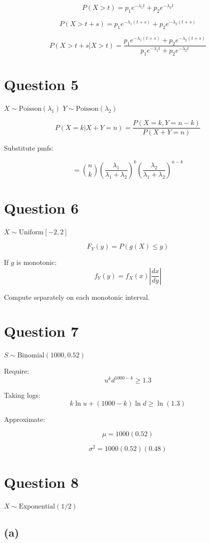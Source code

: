 \documentclass[12pt]{article}
\begin{document}
\[
P(X>t)=p_1 e^{-\lambda_1 t}+p_2 e^{-\lambda_2 t}
\]

\[
P(X>t+s)=p_1 e^{-\lambda_1(t+s)}+p_2 e^{-\lambda_2(t+s)}
\]

\[
P(X>t+s|X>t)
=
\frac{p_1e^{-\lambda_1(t+s)}+p_2e^{-\lambda_2(t+s)}}
{p_1e^{-\lambda_1 t}+p_2e^{-\lambda_2 t}}
\]

\section*{Question 5}

$X \sim \text{Poisson}(\lambda_1)$  
$Y \sim \text{Poisson}(\lambda_2)$

\[
P(X=k|X+Y=n)
=
\frac{P(X=k,Y=n-k)}{P(X+Y=n)}
\]

Substitute pmfs:

\[
=
\binom{n}{k}
\left(\frac{\lambda_1}{\lambda_1+\lambda_2}\right)^k
\left(\frac{\lambda_2}{\lambda_1+\lambda_2}\right)^{n-k}
\]

\section*{Question 6}

$X \sim \text{Uniform}[-2,2]$

\[
F_Y(y)=P(g(X)\le y)
\]

If $g$ is monotonic:
\[
f_Y(y)=f_X(x)\left|\frac{dx}{dy}\right|
\]

Compute separately on each monotonic interval.

\section*{Question 7}

$S \sim \text{Binomial}(1000,0.52)$

Require:
\[
u^k d^{1000-k} \ge 1.3
\]

Taking logs:
\[
k \ln u + (1000-k)\ln d \ge \ln(1.3)
\]

Approximate:

\[
\mu=1000(0.52)
\]

\[
\sigma^2=1000(0.52)(0.48)
\]

\section*{Question 8}

$X \sim \text{Exponential}(1/2)$

\subsection*{(a)}
\end{document}
